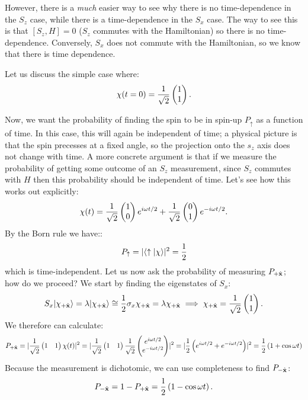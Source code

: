However, there is a \emph{much} easier way to see why there is no time-dependence in the $S_z$ case, while there is a time-dependence in the $S_x$ case. The way to see this is that $[S_z, H] = 0$ ($S_z$ commutes with the Hamiltonian) so there is no time-dependence. Conversely, $S_x$ does not commute with the Hamiltonian, so we know that there is time dependence.

Let us discuss the simple case where:
\begin{equation}
    \chi(t = 0) = \frac{1}{\sqrt{2}}
    \begin{pmatrix}1\\1\end{pmatrix}.
\end{equation}

Now, we want the probability of finding the spin to be in spin-up $P_\uparrow$ as a function of time. In this case, this will again be independent of time; a physical picture is that the spin precesses at a fixed angle, so the projection onto the $s_z$ axis does not change with time. A more concrete argument is that if we measure the probability of getting some outcome of an $S_z$ measurement, since $S_z$ commutes with $H$ then this probability should be independent of time. Let's see how this works out explicitly:
\begin{equation}
    \chi(t) = \frac{1}{\sqrt{2}}\begin{pmatrix}1\\0\end{pmatrix}e^{i\omega t/2} + \frac{1}{\sqrt{2}}\begin{pmatrix}0\\1\end{pmatrix}e^{-i\omega t/2}.
\end{equation}
By the Born rule we have::
\begin{equation}
    P_\uparrow = \lvert \langle \uparrow \lvert \chi \rangle \rvert^2 = \frac{1}{2}
\end{equation}
which is time-independent. Let us now ask the probability of measuring $P_{+\hat{\mathbf{x}}}$; how do we proceed? We start by finding the eigenstates of $S_x$:
\begin{equation}
    S_x \lvert \chi_{+\hat{\mathbf{x}}} \rangle = \lambda \lvert \chi_{+\hat{\mathbf{x}}} \rangle \cong \frac{1}{2}\sigma_x\chi_{+\hat{\mathbf{x}}} = \lambda \chi_{+\hat{\mathbf{x}}} \implies \chi_{+\hat{\mathbf{x}}} = \frac{1}{\sqrt{2}}\begin{pmatrix}1\\1\end{pmatrix}.
\end{equation}
We therefore can calculate:
\begin{equation}
    P_{+\hat{\mathbf{x}}} = \lvert \frac{1}{\sqrt{2}}\begin{pmatrix}1 & 1\end{pmatrix}\chi(t) \rvert^2 = \lvert \frac{1}{\sqrt{2}}\begin{pmatrix}1 & 1\end{pmatrix}\frac{1}{\sqrt{2}}\begin{pmatrix}e^{i\omega t/2} \\ e^{-i\omega t/2}\end{pmatrix} \rvert^2 = \lvert \frac{1}{2}\left(e^{i\omega t/2} + e^{-i\omega t/2}\right) \rvert^2 = \frac{1}{2}\left(1 + \cos\omega t\right)
\end{equation}
Because the measurement is dichotomic, we can use completeness to find $P_{-\hat{\mathbf{x}}}$:
\begin{equation}
    P_{-\hat{\mathbf{x}}} = 1 - P_{+\hat{\mathbf{x}}} = \frac{1}{2}\left(1 - \cos\omega t\right).
\end{equation}